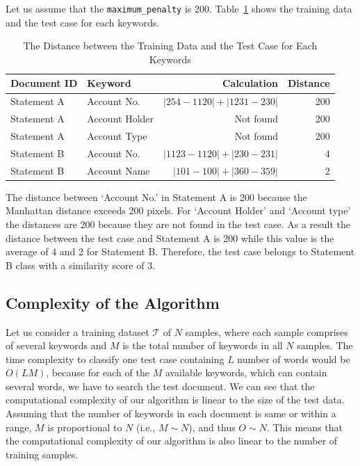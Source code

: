 \begin{example}\label{example}
Let us assume that the \texttt{maximum\_penalty} is 200. Table~\ref{distance} shows the training data and the test case for each keywords.\\
\begin{table}[b]
\centering
\footnotesize
\caption{The Distance between the Training Data and the Test Case for Each Keywords}\label{distance}
\begin{tabular}{llrr}
\toprule
Document ID & Keyword & Calculation & Distance\\
\midrule
Statement A & Account No. & $| 254 - 1120 | + | 1231 - 230 |$ & 200\\
Statement A & Account Holder & Not found & 200\\
Statement A & Account Type & Not found & 200\\
Statement B & Account No. & $| 1123 - 1120 | + | 230 - 231 |$ & 4\\
Statement B & Account Name & $| 101 - 100 | +| 360 - 359 |$ & 2\\
\bottomrule
\end{tabular}
\end{table}

The distance between `Account No.' in Statement A is 200 because the Manhattan distance exceeds 200 pixels. For `Account Holder' and `Account type' the distances are 200 because they are not found in the test case. As a result the distance between the test case and Statement A is 200 while this value is the average of 4 and 2 for Statement B. Therefore, the test case belongs to Statement B class with a similarity score of 3.
\end{example}

\subsection{Complexity of the Algorithm}
Let us consider a training dataset $\mathcal{T}$ of $N$ samples, where each sample comprises of several keywords and $M$ is the total number of keywords in all $N$ samples. The time complexity to classify one test case containing $L$ number of words would be $O(LM)$, because for each of the $M$ available keywords, which can contain several words, we have to search the test document. We can see that the computational complexity of our algorithm is linear to the size of the test data. Assuming that the number of keywords in each document is same or within a range, $M$ is proportional to $N$ (i.e., $M \sim N$), and thus $O \sim N$. This means that the computational complexity of our algorithm is also linear to the number of training samples.

